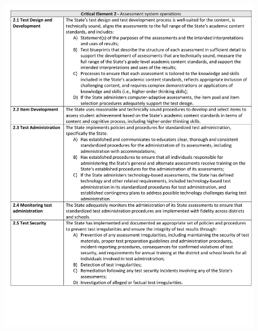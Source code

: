 \documentclass[]{article}
\begin{document}
\newpage

\begin{figure}
\centering
\includegraphics{Figures/peer_rev/PeerReview2.pdf}
\caption{}
\end{figure}

\newpage
\end{document}
